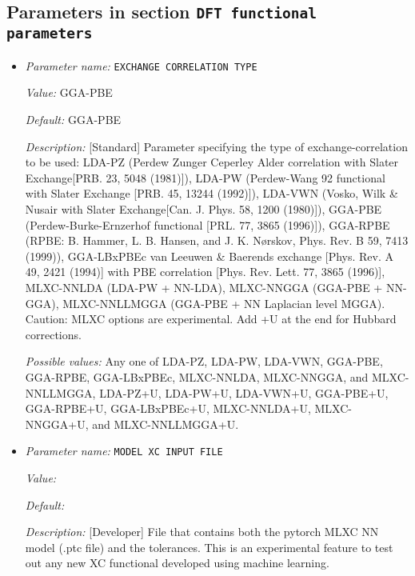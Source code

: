\subsection{Parameters in section \tt DFT functional parameters}
\label{parameters:DFT_20functional_20parameters}

\begin{itemize}
\item {\it Parameter name:} {\tt EXCHANGE CORRELATION TYPE}
\label{parameters:DFT functional parameters/EXCHANGE CORRELATION TYPE}
\label{parameters:DFT_20functional_20parameters/EXCHANGE_20CORRELATION_20TYPE}


{\it Value:} GGA-PBE


{\it Default:} GGA-PBE


{\it Description:} [Standard] Parameter specifying the type of exchange-correlation to be used: LDA-PZ (Perdew Zunger Ceperley Alder correlation with Slater Exchange[PRB. 23, 5048 (1981)]), LDA-PW (Perdew-Wang 92 functional with Slater Exchange [PRB. 45, 13244 (1992)]), LDA-VWN (Vosko, Wilk \& Nusair with Slater Exchange[Can. J. Phys. 58, 1200 (1980)]), GGA-PBE (Perdew-Burke-Ernzerhof functional [PRL. 77, 3865 (1996)]), GGA-RPBE (RPBE: B. Hammer, L. B. Hansen, and J. K. Nørskov, Phys. Rev. B 59, 7413 (1999)), GGA-LBxPBEc van Leeuwen \& Baerends exchange [Phys. Rev. A 49, 2421 (1994)] with  PBE correlation [Phys. Rev. Lett. 77, 3865 (1996)], MLXC-NNLDA (LDA-PW + NN-LDA), MLXC-NNGGA (GGA-PBE + NN-GGA), MLXC-NNLLMGGA (GGA-PBE + NN Laplacian level MGGA). Caution: MLXC options are experimental. Add +U at the end for Hubbard corrections.


{\it Possible values:} Any one of LDA-PZ, LDA-PW, LDA-VWN, GGA-PBE, GGA-RPBE, GGA-LBxPBEc, MLXC-NNLDA, MLXC-NNGGA, and MLXC-NNLLMGGA, LDA-PZ+U, LDA-PW+U, LDA-VWN+U, GGA-PBE+U, GGA-RPBE+U, GGA-LBxPBEc+U, MLXC-NNLDA+U, MLXC-NNGGA+U, and MLXC-NNLLMGGA+U.
\item {\it Parameter name:} {\tt MODEL XC INPUT FILE}
\label{parameters:DFT functional parameters/MODEL XC INPUT FILE}
\label{parameters:DFT_20functional_20parameters/MODEL_20XC_20INPUT_20FILE}


{\it Value:} 


{\it Default:} 


{\it Description:} [Developer] File that contains both the pytorch MLXC NN model (.ptc file) and the tolerances. This is an experimental feature to test out any new XC functional developed using machine learning.


\end{itemize}
